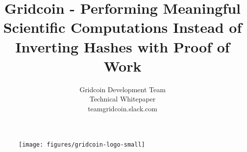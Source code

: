 \documentclass[10pt,a4paper]{article}
\begin{document}
\pagestyle{headings}


\begin{figure}
\centering
\texttt{[image: figures/gridcoin-logo-small]}
\end{figure}


\title{Gridcoin - Performing Meaningful Scientific Computations Instead of Inverting Hashes with Proof of Work}

\author{Gridcoin Development Team\\
Technical Whitepaper\\
teamgridcoin.slack.com\\}


\maketitle



\pagebreak

\tableofcontents

\pagebreak



\pagebreak





\pagebreak



\pagebreak





\pagebreak













\newpage



\pagebreak




\end{document}
